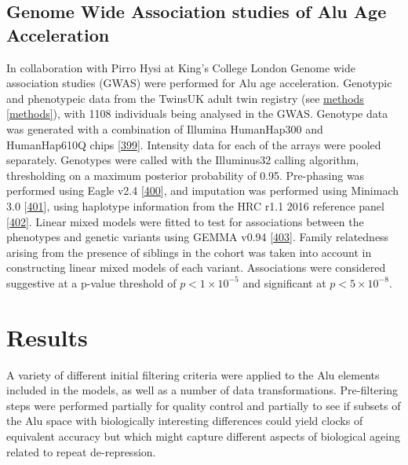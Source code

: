 \documentclass[
]{book}
\begin{document}
\hypertarget{genome-wide-association-studies-of-alu-age-acceleration}{%
\subsection{Genome Wide Association studies of Alu Age Acceleration}\label{genome-wide-association-studies-of-alu-age-acceleration}}

In collaboration with Pirro Hysi at King's College London Genome wide association studies (GWAS) were performed for Alu age acceleration.
Genotypic and phenotypeic data from the TwinsUK adult twin registry (see \protect\hyperlink{methods}{methods} \ref{methods}), with 1108 individuals being analysed in the GWAS.
Genotype data was generated with a combination of Illumina HumanHap300 and HumanHap610Q chips {[}\protect\hyperlink{ref-Hysi2010}{399}{]}.
Intensity data for each of the arrays were pooled separately.
Genotypes were called with the Illuminus32 calling algorithm, thresholding on a maximum posterior probability of 0.95.
Pre-phasing was performed using Eagle v2.4 {[}\protect\hyperlink{ref-Loh2016}{400}{]}, and imputation was performed using Minimach 3.0 {[}\protect\hyperlink{ref-Das2016}{401}{]}, using haplotype information from the HRC r1.1 2016 reference panel {[}\protect\hyperlink{ref-McCarthy2017}{402}{]}.
Linear mixed models were fitted to test for associations between the phenotypes and genetic variants using GEMMA v0.94 {[}\protect\hyperlink{ref-Zhou2012a}{403}{]}.
Family relatedness arising from the presence of siblings in the cohort was taken into account in constructing linear mixed models of each variant.
Associations were considered suggestive at a p-value threshold of \(p < 1\times10^{-5}\) and significant at \(p < 5\times10^{-8}\).

\newpage

\hypertarget{Alu-Results}{%
\section{Results}\label{Alu-Results}}

A variety of different initial filtering criteria were applied to the Alu elements included in the models, as well as a number of data transformations.
Pre-filtering steps were performed partially for quality control and partially to see if subsets of the Alu space with biologically interesting differences could yield clocks of equivalent accuracy but which might capture different aspects of biological ageing related to repeat de-repression.
\end{document}
